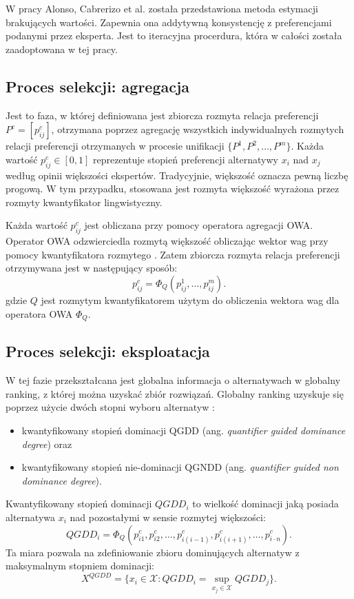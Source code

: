 W pracy Alonso, Cabrerizo et al. \cite{Alonso2009} została przedstawiona metoda
estymacji brakujących wartości. Zapewnia ona addytywną konsystencję z
preferencjami podanymi przez eksperta. Jest to iteracyjna procerdura, która w
całości została zaadoptowana w tej pracy.

\subsection{Proces selekcji: agregacja}
Jest to faza, w której definiowana jest zbiorcza rozmyta relacja preferencji
$P^c = [p^c_{ij}]$, otrzymana poprzez agregację wszystkich indywidualnych
rozmytych relacji preferencji otrzymanych w procesie unifikacji $\{ P^1, P^2,
\dotsc, P^m \}$. Każda wartość $p^c_{ij} \in [0,1]$ reprezentuje stopień
preferencji alternatywy $x_i$ nad $x_j$ według opinii większości ekspertów.
Tradycyjnie, większość oznacza pewną liczbę progową. W tym przypadku, stosowana
jest rozmyta większość wyrażona przez rozmyty kwantyfikator lingwistyczny.

Każda wartość $p^c_{ij}$ jest obliczana przy pomocy operatora agregacji OWA.
Operator OWA odzwierciedla rozmytą większość obliczając wektor wag przy pomocy
kwantyfikatora rozmytego \cite{Peneva2007}. Zatem zbiorcza rozmyta relacja
preferencji otrzymywana jest w następujący sposób:
\begin{equation}
p^c_{ij} = \Phi_Q(p^1_{ij}, \dotsc, p^m_{ij}).
\end{equation}
gdzie $Q$ jest rozmytym kwantyfikatorem użytym do obliczenia wektora wag dla
operatora OWA $\Phi_Q$.

\subsection{Proces selekcji: eksploatacja}
W tej fazie przekształcana jest globalna informacja o alternatywach w globalny
ranking, z której można uzyskać zbiór rozwiązań. Globalny ranking uzyskuje się
poprzez użycie dwóch stopni wyboru alternatyw
\cite{Herrera1996a,Campanella2011}:
\begin{itemize}
  \item kwantyfikowany stopień dominacji QGDD (ang. \textit{quantifier guided
  dominance degree}) oraz
  \item kwantyfikowany stopień nie-dominacji QGNDD (ang. \textit{quantifier
  guided non dominance degree}).
\end{itemize}

Kwantyfikowany stopień dominacji $QGDD_i$ to wielkość dominacji jaką posiada
alternatywa $x_i$ nad pozostałymi w sensie rozmytej większości:
\begin{equation}
QGDD_i = \Phi_Q(p^c_{i1}, p^c_{i2}, \dotsc, p^c_{i(i-1)},p^c_{i(i+1)}, \dotsc,
p^c_{i \cdot n}).
\end{equation}
Ta miara pozwala na zdefiniowanie zbioru dominujących alternatyw z maksymalnym
stopniem dominacji:
\begin{equation}
X^{QGDD} = \{ x_i \in \mathcal{X} : QGDD_i = \sup_{x_j \in \mathcal{X}} QGDD_j
\}.
\end{equation}

